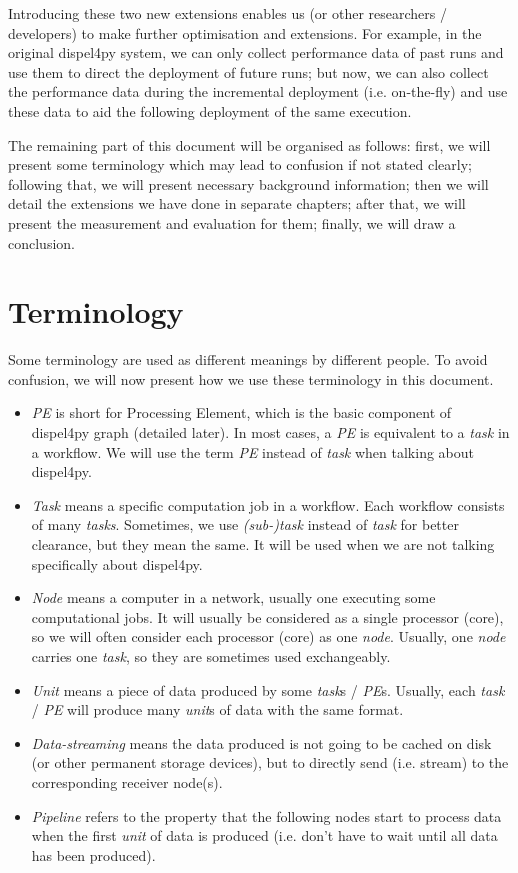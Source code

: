 \documentclass[msc,cs,logo]{infthesis}
\begin{document}
	Introducing these two new extensions enables us (or other researchers / developers) to make further optimisation and extensions. For example, in the original dispel4py system, we can only collect performance data of past runs and use them to direct the deployment of future runs; but now, we can also collect the performance data during the incremental deployment (i.e. on-the-fly) and use these data to aid the following deployment of the same execution.
	
	The remaining part of this document will be organised as follows: first, we will present some terminology which may lead to confusion if not stated clearly; following that, we will present necessary background information; then we will detail the extensions we have done in separate chapters; after that, we will present the measurement and evaluation for them; finally, we will draw a conclusion.
	
	\section{Terminology}
	Some terminology are used as different meanings by different people. To avoid confusion, we will now present how we use these terminology in this document.
	
	\begin{itemize}
		\item \textit{PE} is short for Processing Element, which is the basic component of dispel4py graph (detailed later). In most cases, a \textit{PE} is equivalent to a \textit{task} in a workflow. We will use the term \textit{PE} instead of \textit{task} when talking about dispel4py.
		\item \textit{Task} means a specific computation job in a workflow. Each workflow consists of many \textit{tasks}. Sometimes, we use \textit{(sub-)task} instead of \textit{task} for better clearance, but they mean the same. It will be used when we are not talking specifically about dispel4py.
		\item \textit{Node} means a computer in a network, usually one executing some computational jobs. It will usually be considered as a single processor (core), so we will often consider each processor (core) as one \textit{node}. Usually, one \textit{node} carries one \textit{task}, so they are sometimes used exchangeably.
		\item \textit{Unit} means a piece of data produced by some \textit{task}s / \textit{PE}s. Usually, each \textit{task} / \textit{PE} will produce many \textit{unit}s of data with the same format.
		\item \textit{Data-streaming} means the data produced is not going to be cached on disk (or other permanent storage devices), but to directly send (i.e. stream) to the corresponding receiver node(s).
		\item \textit{Pipeline} refers to the property that the following nodes start to process data when the first \textit{unit} of data is produced (i.e. don't have to wait until all data has been produced).
	\end{itemize}
	
\end{document}
